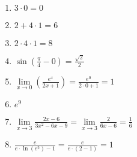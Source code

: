 \item
\begin{enumerate}
\item $3\cdot 0 = 0$
\item $2+4\cdot 1 = 6$
\item $2\cdot 4\cdot 1 = 8$
\item $\sin(\frac{\pi}{4}-0) = \frac{\sqrt{2}}{2}$
\item $\lim\limits_{x \to 0} (\frac{e^x}{2x+1}) = \frac{e^0}{2\cdot 0 + 1} = 1$
\item $e^9$
\item $\lim\limits_{x \to 3} \frac{2x-6}{3x^2-6x-9} = \lim\limits_{x \to 3} \frac{2}{6x-6} = \frac{1}{6}$
\item $\frac{e}{e\cdot\ln(e^2)-1} = \frac{e}{e\cdot(2-1)} = 1$
\end{enumerate}

